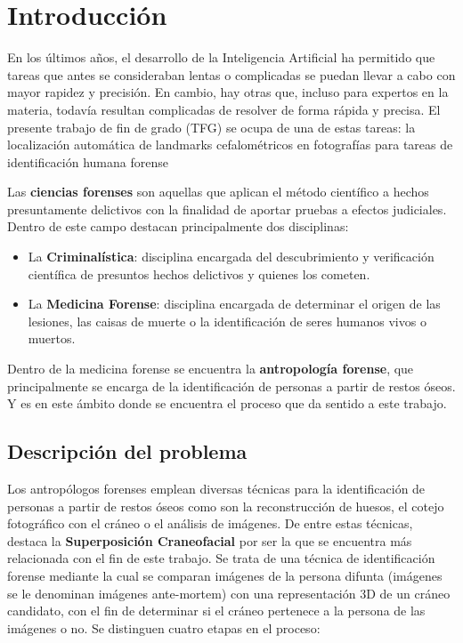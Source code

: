
\chapter{Introducción}  \label{ch:Introduccion_informatica}

\noindent En los últimos años, el desarrollo de la Inteligencia Artificial \cite{norvig2002modern} ha permitido que tareas que antes se consideraban lentas o complicadas se puedan llevar a cabo con mayor rapidez y precisión. En cambio, hay otras que, incluso para expertos en la materia, todavía resultan complicadas de resolver de forma rápida y precisa. El presente trabajo de fin de grado (TFG) se ocupa de una de estas tareas: la localización automática de landmarks cefalométricos en fotografías para tareas de identificación humana forense

\medskip

\noindent Las \textbf{ciencias forenses} son aquellas que aplican el método científico a hechos presuntamente delictivos con la finalidad de aportar pruebas a efectos judiciales. Dentro de este campo destacan principalmente dos disciplinas: 

\begin{itemize}
    \item La \textbf{Criminalística}: disciplina encargada del descubrimiento y verificación científica de presuntos hechos delictivos y quienes los cometen.
    \item La \textbf{Medicina Forense}: disciplina encargada de determinar el origen de las lesiones, las caisas de muerte o la identificación de seres humanos vivos o muertos.
\end{itemize}

\medskip

\noindent Dentro de la medicina forense se encuentra la \textbf{antropología forense}, que principalmente se encarga de la identificación de personas a partir de restos óseos. Y es en este ámbito donde se encuentra el proceso que da sentido a este trabajo.


\section{Descripción del problema}

\noindent Los antropólogos forenses emplean diversas técnicas para la identificación de personas a partir de restos óseos como son la reconstrucción de huesos, el cotejo fotográfico con el cráneo o el análisis de imágenes. De entre estas técnicas, destaca la \textbf{Superposición Craneofacial} por ser la que se encuentra más relacionada con el fin de este trabajo. Se trata de una técnica de identificación forense mediante la cual se comparan imágenes de la persona difunta (imágenes se le denominan imágenes ante-mortem) con una representación 3D de un cráneo candidato, con el fin de determinar si el cráneo pertenece a la persona de las imágenes o no. Se distinguen cuatro etapas en el proceso: 

